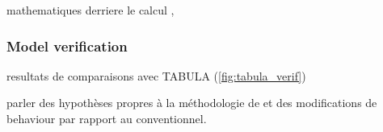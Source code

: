 \documentclass[11pt]{article}
\begin{document}
        mathematiques derriere le calcul
        \cite{madsen_estimation_1995}, \cite{rouchier_solving_2018}

        

        \subsubsection{Model verification} %
        \label{ssub:model_verification}
        
        resultats de comparaisons avec TABULA (\ref{fig:tabula_verif})

        parler des hypothèses propres à la méthodologie de \textcite{pouget_consultants_batiments_2015} et des modifications de behaviour par rapport au conventionnel. 
\end{document}

